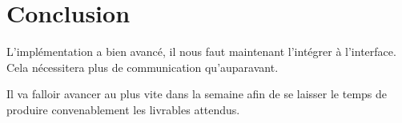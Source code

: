 \documentclass[11pt]{article}
\begin{document}
\section{Conclusion}

L'implémentation a bien avancé, il nous faut maintenant l'intégrer à l'interface. Cela nécessitera plus de communication qu'auparavant.

\bigskip

Il va falloir avancer au plus vite dans la semaine afin de se laisser le temps de produire convenablement les livrables attendus.
\end{document}
